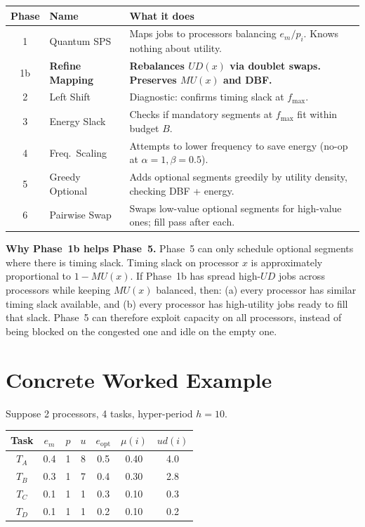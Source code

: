 \documentclass[10pt,twocolumn]{article}
\begin{document}
\begin{center}
\renewcommand{\arraystretch}{1.2}
\begin{tabular}{clp{4.2cm}}
\toprule
\textbf{Phase} & \textbf{Name} & \textbf{What it does} \\
\midrule
1  & Quantum SPS &
     Maps jobs to processors balancing $e_m/p_i$. Knows nothing about utility. \\
1b & \textbf{Refine Mapping} &
     \textbf{Rebalances $UD(x)$ via doublet swaps. Preserves $MU(x)$ and DBF.} \\
2  & Left Shift &
     Diagnostic: confirms timing slack at $f_{\max}$. \\
3  & Energy Slack &
     Checks if mandatory segments at $f_{\max}$ fit within budget $B$. \\
4  & Freq.\ Scaling &
     Attempts to lower frequency to save energy (no-op at $\alpha{=}1, \beta{=}0.5$). \\
5  & Greedy Optional &
     Adds optional segments greedily by utility density, checking DBF + energy. \\
6  & Pairwise Swap &
     Swaps low-value optional segments for high-value ones; fill pass after each. \\
\bottomrule
\end{tabular}
\end{center}

\begin{bluebox}
\textbf{Why Phase~1b helps Phase~5.}
Phase~5 can only schedule optional segments where there is timing slack.
Timing slack on processor $x$ is approximately proportional to
$1 - MU(x)$. If Phase~1b has spread high-$UD$ jobs across processors
while keeping $MU(x)$ balanced, then:
(a) every processor has similar timing slack available, and
(b) every processor has high-utility jobs ready to fill that slack.
Phase~5 can therefore exploit capacity on all processors, instead of
being blocked on the congested one and idle on the empty one.
\end{bluebox}

\section{Concrete Worked Example}

Suppose 2 processors, 4 tasks, hyper-period $h = 10$.

\begin{center}
\small
\begin{tabular}{ccccccc}
\toprule
Task & $e_m$ & $p$ & $u$ & $e_{\text{opt}}$ & $\mu(i)$ & $ud(i)$ \\
\midrule
$T_A$ & 0.4 & 1 & 8 & 0.5 & 0.40 & 4.0 \\
$T_B$ & 0.3 & 1 & 7 & 0.4 & 0.30 & 2.8 \\
$T_C$ & 0.1 & 1 & 1 & 0.3 & 0.10 & 0.3 \\
$T_D$ & 0.1 & 1 & 1 & 0.2 & 0.10 & 0.2 \\
\bottomrule
\end{tabular}
\end{center}
\end{document}
